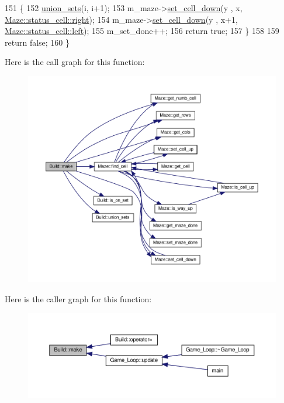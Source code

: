 \begin{DoxyCode}
151     \{
152         \hyperlink{classBuild_af1582ef11fb92698ba75581f2f7ead02}{union\_sets}(i, i+1);
153         m\_maze->\hyperlink{classMaze_ab86292a84aa56a26c4c07f4aa684d9bb}{set\_cell\_down}(y , x, \hyperlink{classMaze_a07167e321eac2b67100fb82ecb98f1d1a7c4f29407893c334a6cb7a87bf045c0d}{Maze::status\_cell::right});
154         m\_maze->\hyperlink{classMaze_ab86292a84aa56a26c4c07f4aa684d9bb}{set\_cell\_down}(y , x+1, \hyperlink{classMaze_a07167e321eac2b67100fb82ecb98f1d1a811882fecd5c7618d7099ebbd39ea254}{Maze::status\_cell::left});
155         m\_set\_done++;
156         \textcolor{keywordflow}{return} \textcolor{keyword}{true};
157     \}
158 
159     \textcolor{keywordflow}{return} \textcolor{keyword}{false};
160 \}
\end{DoxyCode}
Here is the call graph for this function\+:\nopagebreak
\begin{figure}[H]
\begin{center}
\leavevmode
\includegraphics[width=350pt]{classBuild_ada5111f265ee6a43832db25e8da9c3d0_cgraph}
\end{center}
\end{figure}
Here is the caller graph for this function\+:\nopagebreak
\begin{figure}[H]
\begin{center}
\leavevmode
\includegraphics[width=350pt]{classBuild_ada5111f265ee6a43832db25e8da9c3d0_icgraph}
\end{center}
\end{figure}
\mbox{\label{classBuild_a72dbb04928303d0b90d003cb90d85550}} 
